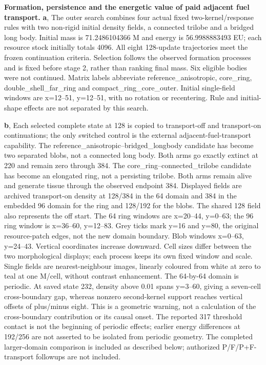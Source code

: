 \textbf{Formation, persistence and the energetic value of paid adjacent fuel transport.}
\textbf{a}, The outer search combines four actual fixed two-kernel/response rules with two non-rigid initial density fields, a connected trilobe and a bridged long body. Initial mass is 71.2486104366 M and energy is 56.9988883493 EU; each resource stock initially totals 4096. All eight 128-update trajectories meet the frozen continuation criteria. Selection follows the observed formation processes and is fixed before stage 2, rather than ranking final mass. Six eligible bodies were not continued. Matrix labels abbreviate reference\_anisotropic, core\_ring, double\_shell\_far\_ring and compact\_ring\_core\_outer. Initial single-field windows are x=12--51, y=12--51, with no rotation or recentering. Rule and initial-shape effects are not separated by this search.

\textbf{b}, Each selected complete state at 128 is copied to transport-off and transport-on continuations; the only switched control is the external adjacent-fuel-transport capability. The reference\_anisotropic--bridged\_longbody candidate has become two separated blobs, not a connected long body. Both arms go exactly extinct at 220 and remain zero through 384. The core\_ring--connected\_trilobe candidate has become an elongated ring, not a persisting trilobe. Both arms remain alive and generate tissue through the observed endpoint 384. Displayed fields are archived transport-on density at 128/384 in the 64 domain and 384 in the embedded 96 domain for the ring and 128/192 for the blobs. The shared 128 field also represents the off start. The 64 ring windows are x=20--44, y=0--63; the 96 ring window is x=36--60, y=12--83. Grey ticks mark y=16 and y=80, the original resource-patch edges, not the new domain boundary. Blob windows x=0--63, y=24--43. Vertical coordinates increase downward. Cell sizes differ between the two morphological displays; each process keeps its own fixed window and scale. Single fields are nearest-neighbour images, linearly coloured from white at zero to teal at one M/cell, without contrast enhancement. The 64-by-64 domain is periodic. At saved state 232, density above 0.01 spans y=3--60, giving a seven-cell cross-boundary gap, whereas nonzero second-kernel support reaches vertical offsets of plus/minus eight. This is a geometric warning, not a calculation of the cross-boundary contribution or its causal onset. The reported 317 threshold contact is not the beginning of periodic effects; earlier energy differences at 192/256 are not asserted to be isolated from periodic geometry. The completed larger-domain comparison is included as described below; authorized P/F/P+F-transport followups are not included.

